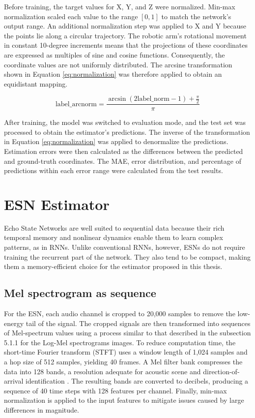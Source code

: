 Before training, the target values for X, Y, and Z were normalized. Min-max normalization scaled each value to the range $[0,1]$ to match the network's output range. An additional normalization step was applied to X and Y because the points lie along a circular trajectory. The robotic arm's rotational movement in constant 10-degree increments means that the projections of these coordinates are expressed as multiples of sine and cosine functions. Consequently, the coordinate values are not uniformly distributed. The arcsine transformation shown in Equation \ref{eq:normalization} was therefore applied to obtain an equidistant mapping.


\begin{equation}
\label{eq:normalization}
\text{label\_arcnorm} =  \frac{\arcsin(2\text{label\_norm} - 1) + \frac{\pi}{2}}{\pi}
\end{equation}

After training, the model was switched to evaluation mode, and the test set was processed to obtain the estimator's predictions. The inverse of the transformation in Equation \ref{eq:normalization} was applied to denormalize the predictions. Estimation errors were then calculated as the differences between the predicted and ground-truth coordinates. The MAE, error distribution, and percentage of predictions within each error range were calculated from the test results.


\section{ESN Estimator}

Echo State Networks are well suited to sequential data because their rich temporal memory and nonlinear dynamics enable them to learn complex patterns, as in RNNs. Unlike conventional RNNs, however, ESNs do not require training the recurrent part of the network. They also tend to be compact, making them a memory-efficient choice for the estimator proposed in this thesis.

\subsection{Mel spectrogram as sequence}

For the ESN, each audio channel is cropped to 20,000 samples to remove the low-energy tail of the signal. The cropped signals are then transformed into sequences of Mel-spectrum values using a process similar to that described in the subsection 5.1.1 for the Log-Mel spectrograms images. To reduce computation time, the short-time Fourier transform (STFT) uses a window length of 1,024 samples and a hop size of 512 samples, yielding 40 frames. A Mel filter bank compresses the data into 128 bands, a resolution adequate for acoustic scene and direction-of-arrival identification \cite{numelbands}. The resulting bands are converted to decibels, producing a sequence of 40 time steps with 128 features per channel. Finally, min-max normalization is applied to the input features to mitigate issues caused by large differences in magnitude.

